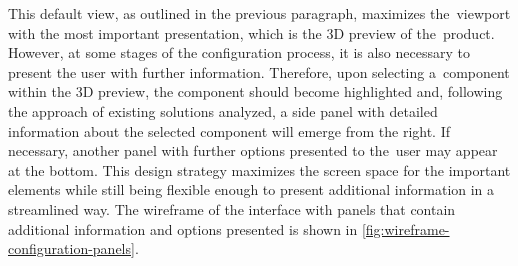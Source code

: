 This default view, as outlined in the previous paragraph, maximizes the~viewport with the most important presentation, which is the 3D preview of the~product. However, at some stages of the configuration process, it is also necessary to present the user with further information. Therefore, upon selecting a~component within the 3D preview, the component should become highlighted and, following the approach of existing solutions analyzed, a side panel with detailed information about the selected component will emerge from the right. If necessary, another panel with further options presented to the~user may appear at the bottom. This design strategy maximizes the screen space for the important elements while still being flexible enough to present additional information in a streamlined way. The wireframe of the interface with panels that contain additional information and options presented is shown in \autoref{fig:wireframe-configuration-panels}.

